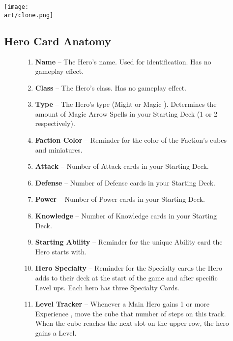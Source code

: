 \begin{multicols*}{2}
\vfill

\hspace{2em}
\texttt{[image: \\art/clone.png]}

\end{multicols*}

\clearpage

\subsection*{\hypertarget{Herocard}{Hero Card Anatomy}}
\bigbreak
\begin{figure}[h]
  \begin{minipage}[t]{0.5\textwidth}
    \vspace{0pt}
    \begin{enumerate}[itemsep=5pt]
      \item \textbf{Name} – The Hero's name.
        Used for identification.
        Has no gameplay effect.
      \item \textbf{Class} – The Hero's class.
        Has no gameplay effect.
      \item \textbf{Type} – The Hero's type (Might  or Magic ).
        Determines the amount of Magic Arrow Spells in your Starting Deck (1 or 2 respectively).
      \item \textbf{Faction Color} – Reminder for the color of the Faction's cubes and miniatures.
      \item \textbf{Attack} – Number of Attack cards in your Starting Deck.
      \item \textbf{Defense} – Number of Defense cards in your Starting Deck.
      \item \textbf{Power} – Number of Power cards in your Starting Deck.
      \item \textbf{Knowledge} – Number of Knowledge cards in your Starting Deck.
      \item \textbf{Starting Ability} – Reminder for the unique Ability card the Hero starts with.
      \item \textbf{Hero Specialty} – Reminder for the Specialty cards the Hero adds to their deck at the start of the game and after specific Level ups.
        Each hero has three Specialty Cards.
      \item \textbf{Level Tracker} – Whenever a Main Hero gains 1 or more Experience , move the cube that number of steps on this track.
        When the cube reaches the next slot on the upper row, the hero gains a Level.

\end{enumerate}
\end{minipage}
\end{figure}
